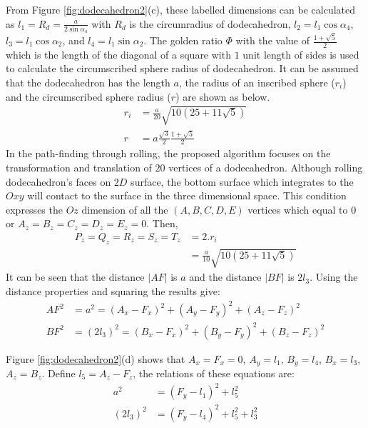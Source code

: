 \noindent From Figure \ref{fig:dodecahedron2}(c), these labelled dimensions can be calculated as $l_1 = R_d = \frac{a}{2\sin{\alpha_4}}$ with $R_d$ is the circumradius of dodecahedron, $l_2 = l_1\cos{\alpha_4}$, $l_3 = l_1\cos{\alpha_2}$, and $l_4 = l_1\sin{\alpha_2}$. 
The golden ratio $\Phi$ with the value of $\frac{1+\sqrt{5}}{2}$ which is the length of the diagonal of a square with $1$ unit length of sides is used to calculate the circumscribed sphere radius of dodecahedron. It can be assumed that the dodecahedron has the length $a$, the radius of an inscribed sphere ($r_i$) and the circumscribed sphere radius ($r$) are shown as below.
\begin{equation*}
\begin{split}
r_i &= \frac{a}{20}\sqrt{10(25+11\sqrt{5})}\\
r &= a\frac{\sqrt{3}}{2}\frac{1+\sqrt{5}}{2}
\end{split}
\end{equation*}
\noindent In the path-finding through rolling, the proposed algorithm focuses on the transformation and translation of $20$ vertices of a dodecahedron. 
Although rolling dodecahedron's faces on $2D$ surface, the bottom surface which integrates to the $Oxy$ will contact to the surface in the three dimensional space. 
This condition expresses the $Oz$ dimension of all the $(A,B,C,D,E)$ vertices which equal to $0$ or $A_z = B_z = C_z = D_z = E_z = 0$. 
Then, 
\begin{equation*} 
\label{equa:eq01}
\begin{split}
P_z = Q_z = R_z = S_z = T_z &= 2.r_i \\
							&= \frac{a}{10}\sqrt{10(25+11\sqrt{5})}
\end{split}
\end{equation*}
\noindent It can be seen that the distance $|AF|$ is $a$ and the distance $|BF|$ is $2l_3$. Using the distance properties and squaring the results give:
\begin{equation*} 
\label{dodeca:eq1}
\begin{split}
AF^2 & = a^2 = (A_x-F_x)^2 + (A_y-F_y)^2 + (A_z-F_z)^2 \\
BF^2 & = (2l_3)^2 = (B_x-F_x)^2 + (B_y-F_y)^2 + (B_z-F_z)^2
\end{split}
\end{equation*}

\noindent Figure \ref{fig:dodecahedron2}(d) shows that $A_x = F_x = 0$, $A_y = l_1$, $B_y = l_4$, $B_x = l_3$, $A_z = B_z$. Define $l_5=A_z-F_z$, the relations of these equations are:
\begin{equation*} 
\label{dodeca:eq2}
\begin{split}
a^2 & = (F_y-l_1)^2 + l_5^2\\
(2l_3)^2 & = (F_y-l_4)^2 + l_5^2 + l_3^2
\end{split}
\end{equation*}

